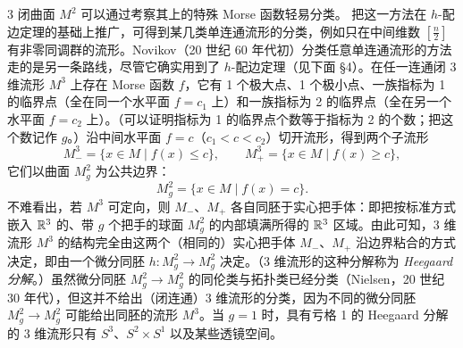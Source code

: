 \begin{example*}{3}
闭曲面 $M^2$ 可以通过考察其上的特殊 Morse 函数轻易分类。
把这一方法在 $h$-配边定理的基础上推广，可得到某几类单连通流形的分类，例如只在中间维数 $[\frac n2]$ 有非零同调群的流形。Novikov（20 世纪 60 年代初）分类任意单连通流形的方法走的是另一条路线，尽管它确实用到了 $h$-配边定理（见下面 §4）。在任一连通闭 3 维流形 $M^3$ 上存在 Morse 函数 $f$，它有 1 个极大点、1 个极小点、一族指标为 1 的临界点（全在同一个水平面 $f=c_1$ 上）和一族指标为 2 的临界点（全在另一个水平面 $f=c_2$ 上）。（可以证明指标为 1 的临界点个数等于指标为 2 的个数；把这个数记作 $g$。）沿中间水平面 $f=c$（$c_1<c<c_2$）切开流形，得到两个子流形
\[
  M^3_-=\{x\in M\mid f(x)\le c\},\qquad
  M^3_+=\{x\in M\mid f(x)\ge c\},
\]
它们以曲面 $M^2_g$ 为公共边界：
\[
  M^2_g=\{x\in M\mid f(x)=c\}.
\]
不难看出，若 $M^3$ 可定向，则 $M_-$、$M_+$ 各自同胚于实心把手体：即把按标准方式嵌入 $\mathbb{R}^3$ 的、带 $g$ 个把手的球面 $M^2_g$ 的内部填满所得的 $\mathbb{R}^3$ 区域。由此可知，3 维流形 $M^3$ 的结构完全由这两个（相同的）实心把手体 $M_-$、$M_+$ 沿边界粘合的方式决定，即由一个微分同胚 $h:M^2_g\to M^2_g$ 决定。（3 维流形的这种分解称为 \emph{Heegaard 分解}。）虽然微分同胚 $M^2_g\to M^2_g$ 的同伦类与拓扑类已经分类（Nielsen，20 世纪 30 年代），但这并不给出（闭连通）3 维流形的分类，因为不同的微分同胚 $M^2_g\to M^2_g$ 可能给出同胚的流形 $M^3$。当 $g=1$ 时，具有亏格 1 的 Heegaard 分解的 3 维流形只有 $S^3$、$S^2\times S^1$ 以及某些透镜空间。
\end{example*}

